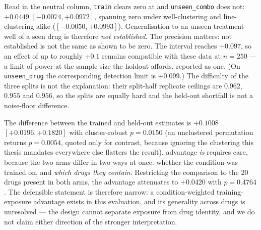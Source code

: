 Read in the neutral column, \texttt{train} clears zero at  and
\texttt{unseen\_combo} does not: $+0.0449$ \nolinebreak[3]$[-0.0074, +0.0972]$, spanning zero
under well-clustering and line-clustering alike ($[-0.0050, +0.0993]$). Generalisation to an unseen
treatment well of a seen drug is therefore \emph{not established}. The precision matters: not
established is not the same as shown to be zero. The interval reaches $+0.097$, so an effect of up
to roughly $+0.1$ remains compatible with these data at $n = 250$ --- a limit of power at the
sample size the holdout affords, reported as one. (On \texttt{unseen\_drug} the corresponding
detection limit is $+0.099$.) The difficulty of the three splits is not the explanation: their
split-half replicate ceilings are $0.962$, $0.955$ and $0.956$, so the splits are equally hard and
the held-out shortfall is not a noise-floor difference.

The difference between the trained and held-out estimates is $+0.1008$
\nolinebreak[3]$[+0.0196, +0.1820]$ with cluster-robust $p = 0.0150$ (an unclustered permutation
returns $p = 0.0054$, quoted only for contrast, because ignoring the clustering this thesis
mandates everywhere else flatters the result).
advantage \emph{is} requires care, because the two arms differ in two ways at once: whether the
condition was trained on, and \emph{which drugs they contain}. Restricting the comparison to the
$20$ drugs present in both arms, the advantage attenuates to $+0.0420$ with $p = 0.4764$. The
defensible statement is therefore narrow: a condition-weighted training-exposure advantage exists
in this evaluation, and its generality across drugs is unresolved --- the design cannot separate
exposure from drug identity, and we do not claim either direction of the stronger interpretation.


